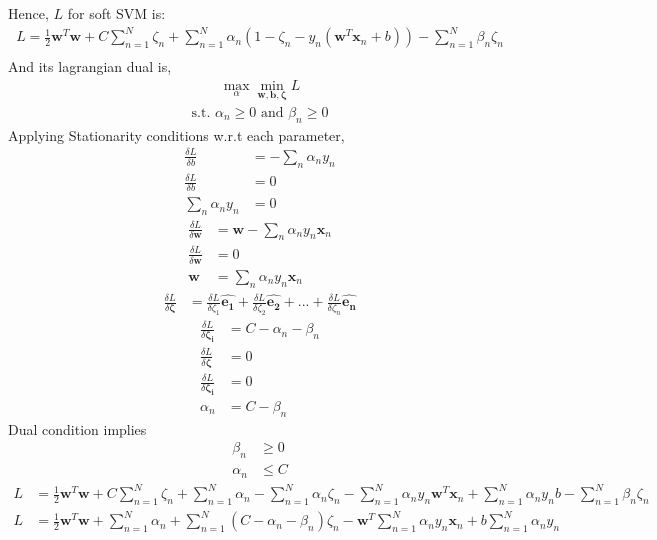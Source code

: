 \documentclass[12pt]{article}
\newcommand{\bd}[1]{\boldsymbol{#1}}
\begin{document}
Hence, \(L\) for soft SVM is:
\begin{align*}
    L = \frac{1}{2}\bd{w}^T\bd{w} + C\sum_{n=1}^N\zeta_n + \sum_{n=1}^N\alpha_n(1 - \zeta_n - y_n(\bd{w}^T\bd{x}_n+b)) - \sum_{n=1}^N\beta_n\zeta_n \\
\end{align*}
And its lagrangian dual is,
\begin{align*}
    \max_{\alpha}\min_{\bd{\bd{w},b,\zeta}} L
\end{align*}
\begin{align*}
    \text{s.t. } \alpha_n \geq 0 \text{ and } \beta_n \geq 0
\end{align*}
Applying Stationarity conditions w.r.t each parameter,
\begin{align}\nonumber
    \frac{\delta L}{\delta b} & = -\sum_n\alpha_ny_n\\ \nonumber
    \frac{\delta L}{\delta b} & = 0 \\
    \sum_n\alpha_ny_n & = 0
\end{align}
\begin{align}\nonumber
    \frac{\delta L}{\delta \bd{w}} & = \bd{w} - \sum_n\alpha_ny_n\bd{x}_n \\ \nonumber
    \frac{\delta L}{\delta \bd{w}} & = 0\\
    \bd{w} & =  \sum_n\alpha_ny_n\bd{x}_n
\end{align}
\begin{align*}
    \frac{\delta L}{\delta \bd{\zeta}} & = \frac{\delta L}{\delta {\zeta_1}}\hat{\bd{e_{1}}} + \frac{\delta L}{\delta {\zeta_2}}\hat{\bd{e_{2}}} + ... + \frac{\delta L}{\delta {\zeta_n}}\hat{\bd{e_{n}}}
\end{align*}
\begin{align}\nonumber
    \frac{\delta L}{\delta \bd{\zeta_i}} & = C - \alpha_n - \beta_n\\ \nonumber
    \frac{\delta L}{\delta \bd{\zeta}} & = 0\\ \nonumber
    \frac{\delta L}{\delta \bd{\zeta_i}} & = 0\\
    \alpha_n & = C - \beta_n
\end{align}
Dual condition implies
\begin{align*}
    \beta_n & \geq 0\\
    \alpha_n & \leq C
\end{align*}
\begin{align*}
     L & = \frac{1}{2}\bd{w}^T\bd{w} + C\sum_{n=1}^N\zeta_n + \sum_{n=1}^N\alpha_n - \sum_{n=1}^N\alpha_n\zeta_n - \sum_{n=1}^N\alpha_ny_n\bd{w}^T\bd{x}_n + \sum_{n=1}^N\alpha_ny_nb - \sum_{n=1}^N\beta_n\zeta_n \\
     L & = \frac{1}{2}\bd{w}^T\bd{w} +  \sum_{n=1}^N\alpha_n + \sum_{n=1}^N(C - \alpha_n - \beta_n)\zeta_n - \bd{w}^T\sum_{n=1}^N\alpha_ny_n\bd{x}_n + b\sum_{n=1}^N\alpha_ny_n \\
\end{align*}
\end{document}
